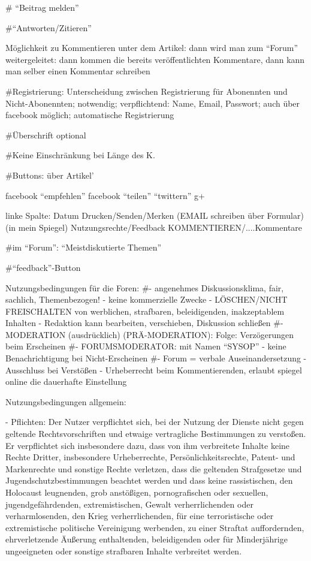 # ``Beitrag melden''

#``Antworten/Zitieren''

Möglichkeit zu Kommentieren unter dem Artikel: dann wird man zum ``Forum'' weitergeleitet: dann kommen die bereits veröffentlichten Kommentare, dann kann man selber einen Kommentar schreiben

#Registrierung: Unterscheidung zwischen Registrierung für Abonennten und Nicht-Abonennten; notwendig; verpflichtend: Name, Email, Passwort; auch über facebook möglich; automatische Registrierung

#Überschrift optional

#Keine Einschränkung bei Länge des K.

#Buttons: über Artikel'

	facebook ``empfehlen''
	facebook ``teilen''
	``twittern''
	g+
	
linke Spalte: 
	Datum
	Drucken/Senden/Merken (EMAIL schreiben über Formular) (in mein Spiegel)
	Nutzungsrechte/Feedback
	KOMMENTIEREN/....Kommentare


	
#im ``Forum'': ``Meistdiskutierte Themen''

#``feedback''-Button

Nutzungsbedingungen für die Foren:
#- angenehmes Diskussionsklima, fair, sachlich, Themenbezogen!
- keine kommerzielle Zwecke
- LÖSCHEN/NICHT FREISCHALTEN von werblichen, strafbaren, beleidigenden, inakzeptablem Inhalten
- Redaktion kann bearbeiten, verschieben, Diskussion schließen
#- MODERATION (ausdrücklich) (PRÄ-MODERATION): Folge: Verzögerungen beim Erscheinen 
#- FORUMSMODERATOR: mit Namen ``SYSOP'' 
- keine Benachrichtigung bei Nicht-Erscheinen
#- Forum = verbale Auseinandersetzung
- Ausschluss bei Verstößen
- Urheberrecht beim Kommentierenden, erlaubt spiegel online die dauerhafte Einstellung



Nutzungsbedingungen allgemein:

- Pflichten: Der Nutzer verpflichtet sich, bei der Nutzung der Dienste nicht gegen geltende Rechtsvorschriften und etwaige vertragliche Bestimmungen zu verstoßen. Er verpflichtet sich insbesondere dazu, dass von ihm verbreitete Inhalte keine Rechte Dritter, insbesondere Urheberrechte, Persönlichkeitsrechte, Patent- und Markenrechte und sonstige Rechte verletzen, dass die geltenden Strafgesetze und Jugendschutzbestimmungen beachtet werden und dass keine rassistischen, den Holocaust leugnenden, grob anstößigen, pornografischen oder sexuellen, jugendgefährdenden, extremistischen, Gewalt verherrlichenden oder verharmlosenden, den Krieg verherrlichenden, für eine terroristische oder extremistische politische Vereinigung werbenden, zu einer Straftat auffordernden, ehrverletzende Äußerung enthaltenden, beleidigenden oder für Minderjährige ungeeigneten oder sonstige strafbaren Inhalte verbreitet werden.

